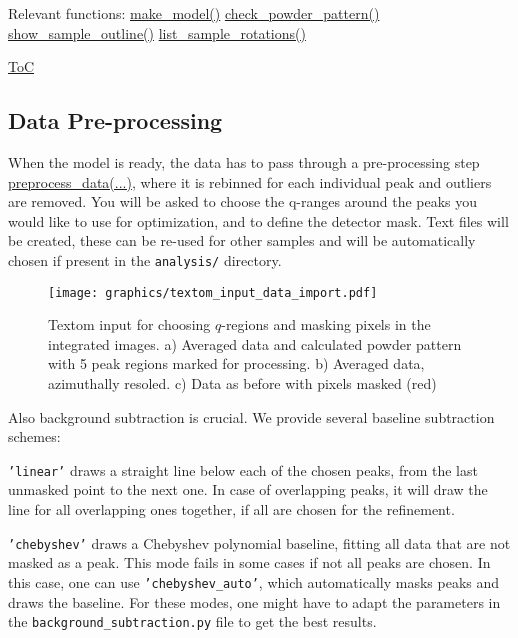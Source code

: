 Relevant functions:
\hyperref[fun:makemodel]{make\_model()}
\hyperref[fun:checkpowderpattern]{check\_powder\_pattern()}
\hyperref[fun:showsampleoutline]{show\_sample\_outline()}
\hyperref[fun:listsamplerotations]{list\_sample\_rotations()}

\begin{flushright}
    \hyperref[toc]{ToC}
\end{flushright}

\subsection{Data Pre-processing}

When the model is ready, the data has to pass through a pre-processing step \hyperref[fun:preprocessdata]{preprocess\_data(...)}, 
where it is rebinned for each individual peak and outliers are removed. 
You will be asked to choose the q-ranges
around the peaks you would like to use for optimization, and to define the detector mask.
Text files will be created, these can be re-used for other samples and will be automatically chosen if present
in the \texttt{analysis/} directory.

\begin{figure}[h!]
    \texttt{[image: graphics/textom\_input\_data\_import.pdf]}
    \centering
    \caption{Textom input for choosing $q$-regions and masking pixels in the integrated images.
        a) Averaged data and calculated powder pattern with 5 peak regions marked for processing.
        b) Averaged data, azimuthally resoled. c) Data as before with pixels masked (red)
        }
\end{figure}

Also background subtraction is crucial. We provide several baseline subtraction schemes:

\texttt{'linear'} draws a straight line below each of the chosen peaks, from the last unmasked point to the next one.
In case of overlapping peaks, it will draw the line for all overlapping ones together, if all are chosen for the refinement.

\texttt{'chebyshev'} draws a Chebyshev polynomial baseline, fitting all data that are not masked as a peak.
This mode fails in some cases if not all peaks are chosen.
In this case, one can use \texttt{'chebyshev\_auto'}, which automatically masks peaks and draws the baseline.
For these modes, one might have to adapt the parameters in the \texttt{background\_subtraction.py} file to get the best results.

